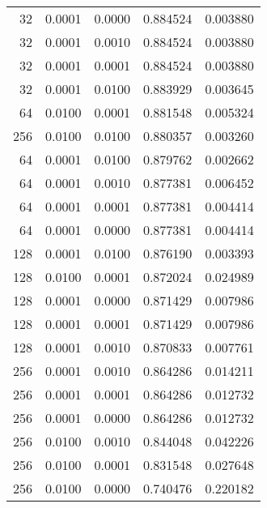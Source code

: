 \begin{tabular}{rrrrr}
  32 &  0.0001 &  0.0000 &  0.884524 &  0.003880 \\
  32 &  0.0001 &  0.0010 &  0.884524 &  0.003880 \\
  32 &  0.0001 &  0.0001 &  0.884524 &  0.003880 \\
  32 &  0.0001 &  0.0100 &  0.883929 &  0.003645 \\
  64 &  0.0100 &  0.0001 &  0.881548 &  0.005324 \\
 256 &  0.0100 &  0.0100 &  0.880357 &  0.003260 \\
  64 &  0.0001 &  0.0100 &  0.879762 &  0.002662 \\
  64 &  0.0001 &  0.0010 &  0.877381 &  0.006452 \\
  64 &  0.0001 &  0.0001 &  0.877381 &  0.004414 \\
  64 &  0.0001 &  0.0000 &  0.877381 &  0.004414 \\
 128 &  0.0001 &  0.0100 &  0.876190 &  0.003393 \\
 128 &  0.0100 &  0.0001 &  0.872024 &  0.024989 \\
 128 &  0.0001 &  0.0000 &  0.871429 &  0.007986 \\
 128 &  0.0001 &  0.0001 &  0.871429 &  0.007986 \\
 128 &  0.0001 &  0.0010 &  0.870833 &  0.007761 \\
 256 &  0.0001 &  0.0010 &  0.864286 &  0.014211 \\
 256 &  0.0001 &  0.0001 &  0.864286 &  0.012732 \\
 256 &  0.0001 &  0.0000 &  0.864286 &  0.012732 \\
 256 &  0.0100 &  0.0010 &  0.844048 &  0.042226 \\
 256 &  0.0100 &  0.0001 &  0.831548 &  0.027648 \\
 256 &  0.0100 &  0.0000 &  0.740476 &  0.220182 \\
\bottomrule
\end{tabular}
